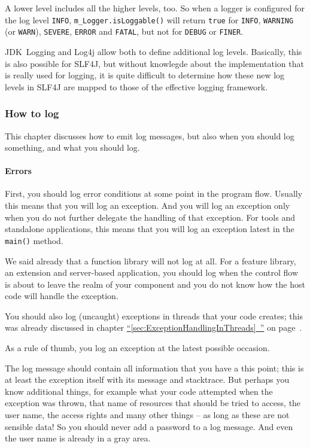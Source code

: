 \documentclass[11pt,a4paper, titlepage, parskip=half, headsepline, footsepline, cleardoublepage=current, headheight=1cm]{scrbook}
\newcommand*{\tqfullvref}[1]{\hyperref[{#1}]{“\ref*{#1}~\nameref*{#1}”} on page~\pageref{#1}}
\begin{document}
A lower level includes all the higher levels, too. So when a logger is configured for the log level \verb#INFO#, \lstinline|m_Logger.isLoggable()| will return \lstinline|true| for \verb#INFO#, \verb#WARNING# (or \verb#WARN#), \verb#SEVERE#, \verb#ERROR# and \verb#FATAL#, but not for \verb#DEBUG# or \verb#FINER#.

JDK~Logging and Log4j allow both to define additional log levels. Basically, this is also possible for SLF4J, but without knowlegde about the implementation that is really used for logging, it is quite difficult to determine how these new log levels in SLF4J are mapped to those of the effective logging framework.

\subsubsection{How to log}\label{sec:HowToLog}
This chapter discusses how to emit log messages, but also when you should log something, and what you should log.

\paragraph{Errors} First, you should log error conditions at some point in the program flow. Usually this means that you will log an exception. And you will log an exception only when you do not further delegate the handling of that exception. For tools and standalone applications, this means that you will log an exception latest in the \lstinline|main()| method.

We said already that a function library will not log at all. For a feature library, an extension and server-based application, you should log when the control flow is about to leave the realm of your component and you do not know how the host code will handle the exception.

You should also log (uncaught) exceptions in threads that your code creates; this was already discussed in chapter \tqfullvref{sec:ExceptionHandlingInThreads}.

As a rule of thumb, you log an exception at the latest possible occasion.

The log message should contain all information that you have a this point; this is at least the exception itself with its message and stacktrace. But perhaps you know additional things, for example what your code attempted when the exception was thrown, that name of resources that should be tried to access, the user name, the access rights and many other things – as long as these are not sensible data! So you should never add a password to a log message. And even the user name is already in a gray area.
\end{document}
